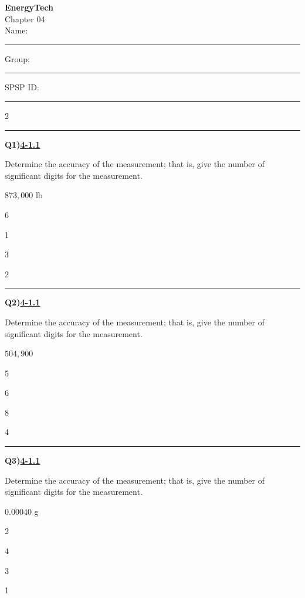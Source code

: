 \documentclass[11pt]{article}
\newenvironment{Qbox}[2]{%
  \par\medskip\noindent\begin{minipage}{\linewidth}%
  \hrule\medskip%
  \textbf{Q#1)}\hfill\textbf{\underline{#2}}\par\smallskip%
}{\par\end{minipage}\par\medskip}
\begin{document}
\begin{center}
  {\LARGE\bfseries EnergyTech}\\[2pt]
  {\Large Chapter 04}\\[6pt]
  Name: \rule{4.5cm}{0.4pt}\quad Group: \rule{3cm}{0.4pt}\quad SPSP ID: \rule{3.5cm}{0.4pt}
\end{center}

\begin{multicols}{2}
\raggedcolumns
\begin{Qbox}{1}{4-1.1}
Determine the accuracy of the measurement; that is, give the number of significant digits for the measurement.\par\medskip $873{,}000$ lb
\begin{choices}
  \item 6
  \item 1
  \item 3
  \item 2
\end{choices}
\end{Qbox}

\begin{Qbox}{2}{4-1.1}
Determine the accuracy of the measurement; that is, give the number of significant digits for the measurement.\par\medskip $504{,}9\overline{0}0$
\begin{choices}
  \item 5
  \item 6
  \item 8
  \item 4
\end{choices}
\end{Qbox}

\begin{Qbox}{3}{4-1.1}
Determine the accuracy of the measurement; that is, give the number of significant digits for the measurement.\par\medskip $0.00040$ g
\begin{choices}
  \item 2
  \item 4
  \item 3
  \item 1
\end{choices}
\end{Qbox}


\end{multicols}
\end{document}

